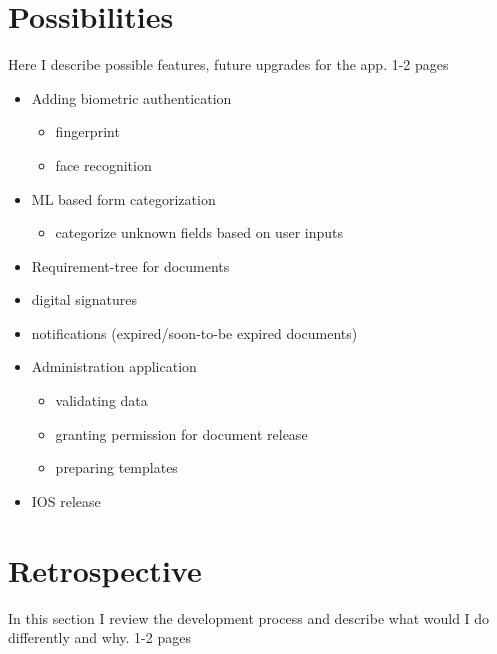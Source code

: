 \section{Possibilities}
Here I describe possible features, future upgrades for the app. 1-2 pages

\begin{itemize}
	\item Adding biometric authentication
	\begin{itemize}
		\item fingerprint
		\item face recognition
	\end{itemize}
	\item ML based form categorization
	\begin{itemize}
		\item categorize unknown fields based on user inputs
	\end{itemize}
	\item Requirement-tree for documents
	\item digital signatures
	\item notifications (expired/soon-to-be expired documents)
	\item Administration application
	\begin{itemize}
		\item validating data
		\item granting permission for document release
		\item preparing templates
	\end{itemize}
	\item IOS release
\end{itemize}

\section{Retrospective}
In this section I review the development process and describe what would I do differently and why. 1-2 pages
